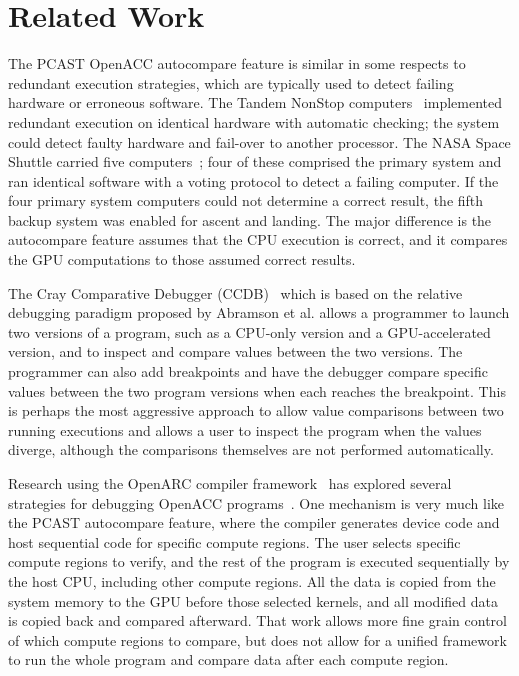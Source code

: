\section{Related Work}


The PCAST OpenACC autocompare feature is similar in some respects to redundant execution strategies, which are typically used to detect failing hardware or erroneous software.
The Tandem NonStop computers~\cite{bartlett.tandem.86} implemented redundant execution on identical hardware with automatic checking; the system could detect faulty hardware and fail-over to another processor.
The NASA Space Shuttle carried five computers~\cite{fraser.astro.74}; four of these comprised the primary system and ran identical software with a voting protocol to detect a failing computer.
If the four primary system computers could not determine a correct result, the fifth backup system was enabled for ascent and landing.
The major difference is the autocompare feature assumes that the CPU execution is correct, and it compares the GPU computations to those assumed correct results.

The Cray Comparative Debugger (CCDB)~\cite{derose.sc.15} which is based on the relative debugging paradigm proposed by Abramson et al. \cite{abramson1994relative}\cite{abramson1996relative} allows a programmer to launch two versions of a program, such as a CPU-only version and a GPU-accelerated version, and to inspect and compare values between the two versions.
The programmer can also add breakpoints and have the debugger compare specific values between the two program versions when each reaches the breakpoint.
This is perhaps the most aggressive approach to allow value comparisons between two running executions and allows a user to inspect the program when the values diverge, although the comparisons themselves are not performed automatically.

Research using the OpenARC compiler framework~\cite{lee.hpdc.14} has explored several strategies for debugging OpenACC programs~\cite{lee.ipdps.14}.
One mechanism is very much like the PCAST autocompare feature, where the compiler generates device code and host sequential code for specific compute regions.
The user selects specific compute regions to verify, and the rest of the program is executed sequentially by the host CPU, including other compute regions.
All the data is copied from the system memory to the GPU before those selected kernels, and all modified data is copied back and compared afterward.
That work allows more fine grain control of which compute regions to compare, but does not allow for a unified framework to run the whole program and compare data after each compute region.

